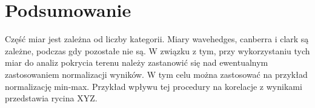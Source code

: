 \documentclass{amuthesis}
\begin{document}

\hypertarget{sec-podsumowanie}{%
\chapter{Podsumowanie}\label{sec-podsumowanie}}

Część miar jest zależna od liczby kategorii. Miary wavehedges, canberra
i clark są zależne, podczas gdy pozostałe nie są. W związku z tym, przy
wykorzystaniu tych miar do analiz pokrycia terenu należy zastanowić się
nad ewentualnym zastosowaniem normalizacji wyników. W tym celu można
zastosować na przykład normalizację min-max. Przykład wpływu tej
procedury na korelacje z wynikami przedstawia rycina XYZ.

\printbibliography[heading=bibintoc, title=Bibliografia]
\end{document}
